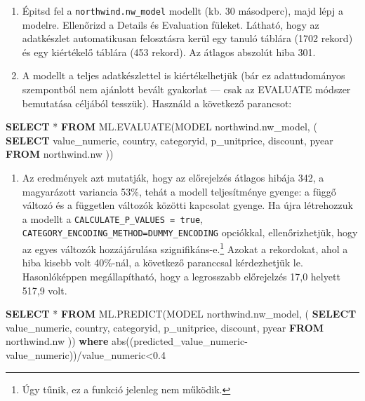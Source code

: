 \documentclass[
  magyar,
]{article}
\newenvironment{Shaded}{}{}
\newcommand{\FloatTok}[1]{\textcolor[rgb]{0.25,0.63,0.44}{#1}}
\newcommand{\FunctionTok}[1]{\textcolor[rgb]{0.02,0.16,0.49}{#1}}
\newcommand{\KeywordTok}[1]{\textcolor[rgb]{0.00,0.44,0.13}{\textbf{#1}}}
\newcommand{\NormalTok}[1]{#1}
\newcommand{\OperatorTok}[1]{\textcolor[rgb]{0.40,0.40,0.40}{#1}}
\providecommand{\tightlist}{%
  \setlength{\itemsep}{0pt}\setlength{\parskip}{0pt}}
\begin{document}
\begin{enumerate}
\def\labelenumi{\arabic{enumi}.}
\setcounter{enumi}{10}
\item
  Épitsd fel a \texttt{northwind.nw\_model} modellt (kb. 30 másodperc),
  majd lépj a modelre. Ellenőrizd a Details és Evaluation füleket.
  Látható, hogy az adatkészlet automatikusan felosztásra kerül egy
  tanuló táblára (1702 rekord) és egy kiértékelő táblára (453 rekord).
  Az átlagos abszolút hiba 301.
\item
  A modellt a teljes adatkészlettel is kiértékelhetjük (bár ez
  adattudományos szempontból nem ajánlott bevált gyakorlat --- csak az
  EVALUATE módszer bemutatása céljából tesszük). Használd a következő
  parancsot:
\end{enumerate}

\begin{Shaded}
\begin{Highlighting}[]
\KeywordTok{SELECT} \OperatorTok{*} \KeywordTok{FROM}\NormalTok{ ML.EVALUATE(MODEL \textasciigrave{}northwind.nw\_model\textasciigrave{}, (}
 \KeywordTok{SELECT}\NormalTok{ value\_numeric, country, categoryid, p\_unitprice, discount, pyear}
 \KeywordTok{FROM}\NormalTok{ \textasciigrave{}northwind.nw\textasciigrave{}}
\NormalTok{))}
\end{Highlighting}
\end{Shaded}

\begin{enumerate}
\def\labelenumi{\arabic{enumi}.}
\setcounter{enumi}{12}
\tightlist
\item
  Az eredmények azt mutatják, hogy az előrejelzés átlagos hibája 342, a
  magyarázott variancia 53\%, tehát a modell teljesítménye gyenge: a
  függő változó és a független változók közötti kapcsolat gyenge. Ha
  újra létrehozzuk a modellt a \texttt{CALCULATE\_P\_VALUES\ =\ true},
  \texttt{CATEGORY\_ENCODING\_METHOD=\textquotesingle{}DUMMY\_ENCODING\textquotesingle{}}
  opciókkal, ellenőrizhetjük, hogy az egyes változók hozzájárulása
  szignifikáns-e.\footnote{Úgy tűnik, ez a funkció jelenleg nem működik.}
  Azokat a rekordokat, ahol a hiba kisebb volt 40\%-nál, a következő
  paranccsal kérdezhetjük le. Hasonlóképpen megállapítható, hogy a
  legrosszabb előrejelzés 17,0 helyett 517,9 volt.
\end{enumerate}

\begin{Shaded}
\begin{Highlighting}[]
\KeywordTok{SELECT} \OperatorTok{*} \KeywordTok{FROM}\NormalTok{ ML.PREDICT(MODEL \textasciigrave{}northwind.nw\_model\textasciigrave{}, (}
 \KeywordTok{SELECT}\NormalTok{ value\_numeric, country, categoryid, p\_unitprice, discount, pyear}
 \KeywordTok{FROM}\NormalTok{ \textasciigrave{}northwind.nw\textasciigrave{}}
\NormalTok{)) }\KeywordTok{where} \FunctionTok{abs}\NormalTok{((predicted\_value\_numeric}\OperatorTok{{-}}\NormalTok{value\_numeric))}\OperatorTok{/}\NormalTok{value\_numeric}\OperatorTok{\textless{}}\FloatTok{0.4}
\end{Highlighting}
\end{Shaded}
\end{document}

